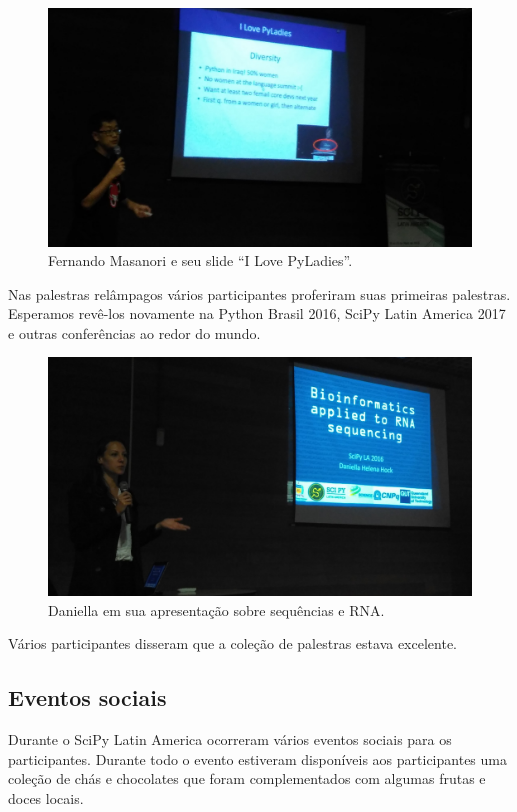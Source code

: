 \documentclass[12pt]{article}
\begin{document}
\begin{figure}[!htb]
\center
\includegraphics[height=.3\textheight]{talks-pyladies.jpg}
\caption{Fernando Masanori e seu slide ``I Love PyLadies''.}
\end{figure}

Nas palestras relâmpagos vários participantes proferiram suas primeiras
palestras. Esperamos revê-los novamente na Python Brasil 2016, SciPy Latin
America 2017 e outras conferências ao redor do mundo.

\begin{figure}[!htb]
\center
\includegraphics[height=.3\textheight]{talks-rna.jpg}
\caption{Daniella em sua apresentação sobre sequências e RNA.}
\end{figure}

Vários participantes disseram que a coleção de palestras estava excelente.

\subsection*{Eventos sociais}

Durante o SciPy Latin America ocorreram vários eventos sociais para os
participantes. Durante todo o evento estiveram disponíveis aos participantes uma
coleção de chás e chocolates que foram complementados com algumas frutas e doces
locais.
\end{document}
